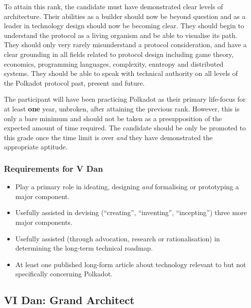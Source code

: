 \documentclass[9pt,oneside]{amsart}
\begin{document}
To attain this rank, the candidate must have demonstrated clear levels of architecture. Their abilities as a builder should now be beyond question and as a leader in technology design should now be becoming clear. They should begin to understand the protocol as a living organism and be able to visualise its path. They should only very rarely misunderstand a protocol consideration, and have a clear grounding in all fields related to protocol design including game theory, economics, programming languages, complexity, enntropy and distributed systems. They should be able to speak with technical authority on all levels of the Polkadot protocol past, present and future.

The participant will have been practicing Polkadot as their primary life-focus for at least \textbf{one} year, unbroken, after attaining the previous rank. However, this is only a bare minimum and should not be taken as a presupposition of the expected amount of time required. The candidate should be only be promoted to this grade once the time limit is over \emph{and} they have demonstrated the appropriate aptitude.

\subsubsection{Requirements for V Dan}\label{requirements-5}

\begin{itemize}
\item Play a primary role in ideating, designing \emph{and} formalising or prototyping a major component.
\item Usefully assisted in devising (``creating'', ``inventing'', ``incepting'') three more major components.
\item Usefully assisted (through advocation, research or rationalisation) in determining the long-term technical roadmap.
\item At least one published long-form article about technology relevant to but not specifically concerning Polkadot.
\end{itemize}

\subsection{VI Dan: Grand Architect}\label{vi-dan-grand-architect}~\\

\end{document}
